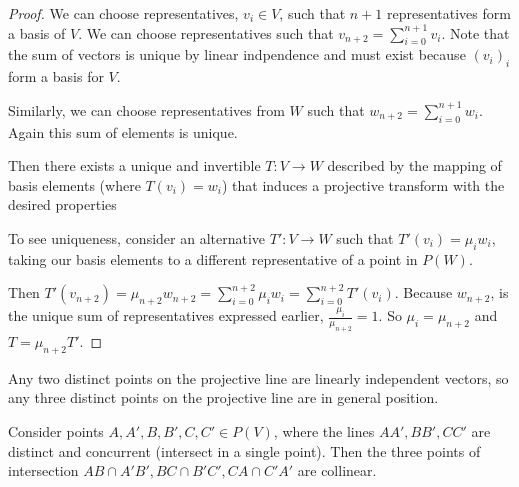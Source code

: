 \documentclass[10pt]{article}
\begin{document}
\begin{proof}

	We can choose representatives, $v_i \in V$, such that $n+1$ representatives
	form a basis of $V$. We can choose representatives such that
	$v_{n+2} = \sum_{i=0}^{n+1} v_i$. Note that the sum of vectors is unique by
	linear indpendence and must exist because $( v_i )_i$ form a basis for $V$.

	Similarly, we can choose representatives from $W$ such that $w_{n+2} =
	\sum_{i=0}^{n+1} w_i$. Again this sum of elements is unique.

	Then there exists a unique and invertible $T: V \to W$ described by the mapping of basis
	elements (where $T(v_i) = w_i$) that induces a projective transform with the
	desired properties

	To see uniqueness, consider an alternative $T': V \to W$ such that $T'(v_i) =
	\mu_i w_i$, taking our basis elements to a different representative of a point in $P(W)$.

	Then $T'(v_{n+2}) = \mu_{n+2} w_{n+2} = \sum_{i=0}^{n+2} \mu_i w_i =
	\sum_{i=0}^{n+2} T'(v_i)$. Because $w_{n+2}$, is the unique sum of
	representatives expressed earlier, $\frac{\mu_i}{\mu_{n+2}} = 1$. So $\mu_i =
	\mu_{n+2}$ and $T = \mu_{n+2}T'$.

\end{proof}

\begin{note}
Any two distinct points on the projective line are linearly independent
vectors, so any three distinct points on the projective line are in general
position.
\end{note}

\begin{theorem}
	Consider points $A, A', B, B', C, C' \in P(V)$, where the lines $AA', BB',
	CC'$ are distinct and concurrent (intersect in a single point). Then the
	three points of intersection $AB \cap A'B', BC \cap B'C', CA \cap C'A'$ are
	collinear.
\end{theorem}
\end{document}
